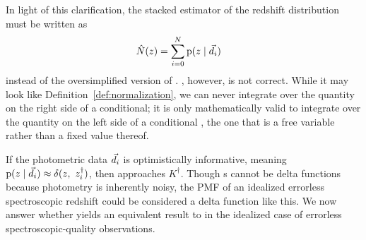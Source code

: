 In light of this clarification, the stacked estimator of the redshift distribution must be written as
\begin{align}
\eqlabel{eqn:stackwithdata}
    \hat{N}(z) &= \sum_{i = 0}^{N} \pr{z \gvn \data_{i}}
\end{align}
instead of the oversimplified version of .
, however, is not correct.
While it may look like Definition~\ref{def:normalization}, we can never integrate over the quantity on the right side of a conditional; 
it is only mathematically valid to integrate over the quantity on the left side of a conditional \citep{hogg_data_2012}, the one that is a free variable rather than a fixed value thereof.

If the photometric data $\vec{d}_{i}$ is optimistically informative, meaning ${\mathrm{p}(z \mid \vec{d}_{i}) \approx \delta(z,\ z_{i}^{\dagger})}$, then  approaches $K^{\dagger}$.
Though \pzpdf s cannot be delta functions because photometry is inherently noisy,
the PMF of an idealized errorless spectroscopic redshift could be considered a delta function like this.
We now answer whether  yields an equivalent result to  in the idealized case of errorless spectroscopic-quality observations.

